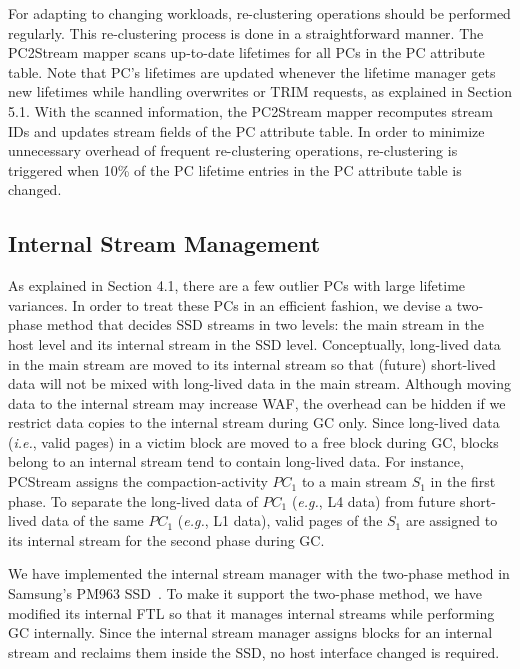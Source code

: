 {For adapting to changing workloads, re-clustering operations should be
performed regularly. This re-clustering process is done in a straightforward
manner. The PC2Stream mapper scans up-to-date lifetimes for all PCs in the PC
attribute table. Note that PC's lifetimes are updated whenever the lifetime
manager gets new lifetimes while handling overwrites or TRIM requests, as
explained in Section 5.1.  With the scanned information, the PC2Stream mapper
recomputes stream IDs and updates stream fields of the PC attribute table.  In
order to minimize unnecessary overhead of frequent re-clustering operations,
re-clustering is triggered when 10\% of the PC lifetime entries in the PC
attribute table is changed.


\subsection{Internal Stream Management}
As explained in Section 4.1, there are a few outlier PCs with large lifetime
variances. In order to treat these PCs in an efficient fashion, we devise a
two-phase method that decides SSD streams in two levels: the main stream in the
host level and its internal stream in the SSD level.  Conceptually, long-lived
data in the main stream are moved to its internal stream so that (future)
short-lived data will not be mixed with long-lived data in the main stream.
Although moving data to the internal stream may increase WAF, the overhead can
be hidden if we restrict data copies to the internal stream during GC only.
Since long-lived data ({\it i.e.}, valid pages) in a victim block are moved to a free
block during GC, blocks belong to an internal stream tend to contain long-lived
data.  For instance, \textsf{\small PCStream} assigns the compaction-activity
{\it $PC_1$} to a main stream {\it $S_1$} in the first phase.  To separate the
long-lived data of {\it $PC_1$} ({\it e.g.}, L4 data) from future short-lived data of
the same {\it $PC_1$} ({\it e.g.}, L1 data), valid pages of the {\it $S_1$} are
assigned to its internal stream for the second phase during GC.

We have implemented the internal stream manager with the two-phase method in
Samsung's PM963 SSD~\cite{PM963}. To make it support the two-phase method, we
have modified its internal FTL so that it manages internal streams while
performing GC internally.  Since the internal stream manager assigns blocks for
an internal stream and reclaims them inside the SSD, no host interface changed
is required.

}
